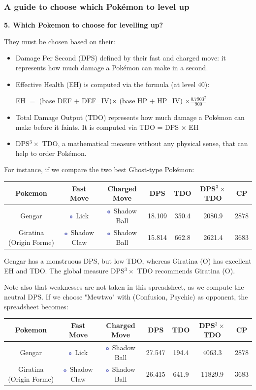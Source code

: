 \documentclass[8pt,aspectratio=169,compress]{beamer}
\newcommand{\ghostsimp}{\includegraphics[height=0.15cm]{../../images/type/simplified/ghost.png}}
\begin{document}
\begin{frame}
\frametitle{A guide to choose which Pok\'emon to level up}

\begin{block}{}
\begin{tiny}
\textbf{5. Which Pokemon to choose for levelling up?}

They must be chosen based on their:
\begin{itemize}
  \item Damage Per Second (DPS) defined by their fast and charged move: it represents how much damage a Pok\'emon can make in a second.
  \item Effective Health (EH) is computed via the formula (at level 40):
\begin{center}
EH $=$ (base DEF + DEF\_IV)$\times$ (base HP + HP\_IV) $\times \frac{0.7903^2}{900}$
\end{center}
  \item Total Damage Output (TDO) represents how much damage a Pok\'emon can make before it faints. It is computed via TDO = DPS $\times$ EH
  \item  DPS$^3 \times$ TDO, a mathematical measure without any physical sense, that can help to order Pok\'emon.
\end{itemize} 

For instance, if we compare the two best Ghost-type Pokémon:
\begin{center}
\begin{tabular}{ccccccc}
Pokemon & Fast Move & Charged Move & DPS & TDO & DPS$^3 \times$ TDO & CP \\ \hline
Gengar&	\ghostsimp~Lick	&\ghostsimp~Shadow Ball	&18.109	&350.4	&2080.9	&2878\\ 
Giratina (Origin Forme)&	\ghostsimp~Shadow Claw	&\ghostsimp~Shadow Ball&	15.814	&662.8	&2621.4	&3683\\ 
\end{tabular}
\end{center}

Gengar has a monstruous DPS, but low TDO, whereas Giratina (O) has excellent EH and TDO. The global measure  DPS$^3 \times$ TDO recommends Giratina (O).

Note also that weaknesses are not taken in this spreadsheet, as we compute the neutral DPS. If we choose "Mewtwo" with (Confusion, Psychic) as opponent, the spreadsheet becomes:
\begin{center}
\begin{tabular}{ccccccc}
Pokemon & Fast Move & Charged Move & DPS & TDO & DPS$^3 \times$ TDO & CP \\ \hline
Gengar&	\ghostsimp~Lick	&\ghostsimp~Shadow Ball	&27.547& 194.4 & 4063.3& 2878\\ 
Giratina (Origin Forme)&	\ghostsimp~Shadow Claw	&\ghostsimp~Shadow Ball&	26.415	&641.9	&11829.9	&3683\\ 
\end{tabular}
\end{center}


\end{tiny}
\end{block}
\end{frame}
\end{document}
